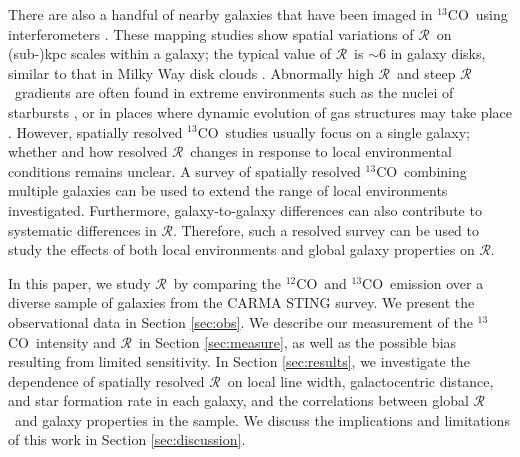 \documentclass{emulateapj}
\def\ttco{\mbox{$^{13}$CO}}
\def\twco{\mbox{$^{12}$CO}}
\def\rtt{$\mathcal{R}$}
\begin{document}
There are also a handful of nearby galaxies that have been imaged in \ttco \
using interferometers \citep[e.g.][]{Turner1992, M64, Meier2004, Aalto2010, Konig2016}.
These mapping studies show spatial variations of  \rtt \ on (sub-)kpc scales within a galaxy;  
the typical value of \rtt \ is $\sim 6$ in
galaxy disks, similar to that in Milky Way disk clouds \citep{Polk1988, Roman-Duval2016}.  
Abnormally high \rtt \ and steep \rtt \ gradients are often found in extreme environments 
such as the nuclei of starbursts \citep{Aalto2010},
or in places where dynamic evolution of gas structures may take place \citep{Huttemeister2000, Meier2004}.
However, spatially resolved \ttco \ studies usually focus on a single galaxy;
whether and how resolved \rtt \ changes in  response to local environmental conditions remains unclear.
A survey of spatially resolved \ttco \ combining multiple galaxies can be used to 
extend the range of local environments  investigated.
Furthermore, galaxy-to-galaxy differences can also contribute to 
systematic differences in \rtt. Therefore, such a resolved survey can be 
used to study the effects of both local environments and global galaxy  properties on \rtt.
   
In this paper, we study  \rtt \ by comparing the \twco \ and \ttco \ emission
over a diverse sample of galaxies from the CARMA STING survey.
We present the observational data in Section \ref{sec:obs}. 
We describe our measurement of the \ttco \ intensity and \rtt  \ in
Section \ref{sec:measure}, as well as the possible bias 
resulting from limited sensitivity.  
In Section \ref{sec:results}, we investigate the dependence of spatially resolved \rtt \ on 
local line width, galactocentric distance, and star formation rate in
each galaxy, and the correlations between global \rtt \ and galaxy properties in the sample. 
We discuss the implications and limitations of this work in Section \ref{sec:discussion}. 

\end{document}

